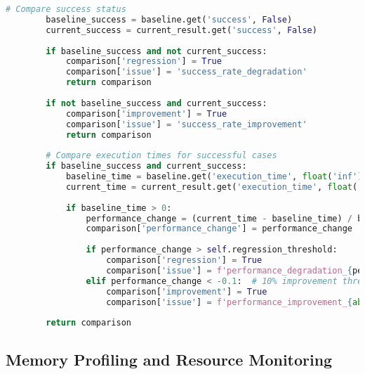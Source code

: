 \begin{lstlisting}[language=Python, caption=Regression Testing Framework]
        # Compare success status
        baseline_success = baseline.get('success', False)
        current_success = current_result.get('success', False)
        
        if baseline_success and not current_success:
            comparison['regression'] = True
            comparison['issue'] = 'success_rate_degradation'
            return comparison
        
        if not baseline_success and current_success:
            comparison['improvement'] = True
            comparison['issue'] = 'success_rate_improvement'
            return comparison
        
        # Compare execution times for successful cases
        if baseline_success and current_success:
            baseline_time = baseline.get('execution_time', float('inf'))
            current_time = current_result.get('execution_time', float('inf'))
            
            if baseline_time > 0:
                performance_change = (current_time - baseline_time) / baseline_time
                comparison['performance_change'] = performance_change
                
                if performance_change > self.regression_threshold:
                    comparison['regression'] = True
                    comparison['issue'] = f'performance_degradation_{performance_change:.1%}'
                elif performance_change < -0.1:  # 10% improvement threshold
                    comparison['improvement'] = True
                    comparison['issue'] = f'performance_improvement_{abs(performance_change):.1%}'
        
        return comparison
\end{lstlisting}

\subsection{Memory Profiling and Resource Monitoring}
\label{appendix:memory-profiling-testing}

